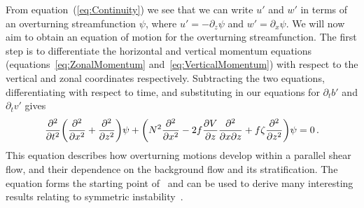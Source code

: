     From equation~(\ref{eq:Continuity}) we see that we can write $u'$ and $w'$ in terms of an overturning streamfunction $\psi$, where $u' = - \partial_z \psi$ and $w' = \partial_x \psi$. We will now aim to obtain an equation of motion for the overturning streamfunction. The first step is to differentiate the horizontal and vertical momentum equations (equations~\ref{eq:ZonalMomentum} and~\ref{eq:VerticalMomentum}) with respect to the vertical and zonal coordinates respectively. Subtracting the two equations, differentiating with respect to time, and substituting in our equations for $\partial_t b'$ and $\partial_t v'$ gives
    \begin{equation}
    \label{eq:OriginalHoskins}
    \pdv[2]{}{t} \bigg(\pdv[2]{}{x} + \pdv[2]{}{z}\bigg) \psi + \bigg( N^2 \pdv[2]{}{x} - 2 f \pdv{V}{z} \pdv[2]{}{x}{z} + f \zeta \pdv[2]{}{z} \bigg) \psi = 0 \, .
    \end{equation}
    This equation describes how overturning motions develop within a parallel shear flow, and their dependence on the background flow and its stratification. The equation forms the starting point of~\citet{Hoskins1974} and can be used to derive many interesting results relating to symmetric instability~\citep[see also][]{Ooyama1966}.
    
